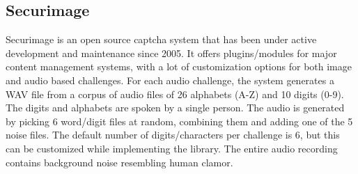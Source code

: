 \subsection{Securimage}

Securimage is an open source captcha system that has been under active development and maintenance 
since 2005. It offers plugins/modules for major content management systems, with a lot of customization 
options for both image and audio based challenges. For each audio challenge, the system generates a WAV 
file from a corpus of audio files of 26 alphabets (A-Z) and 10 digits (0-9). The digits and alphabets are 
spoken by a single person. The audio is generated by picking 6 word/digit files at random, combining them and adding one 
of the 5 noise files. The default number of digits/characters per challenge is 6, but this can 
be customized while implementing the library. The entire audio recording contains background noise resembling
human clamor.

